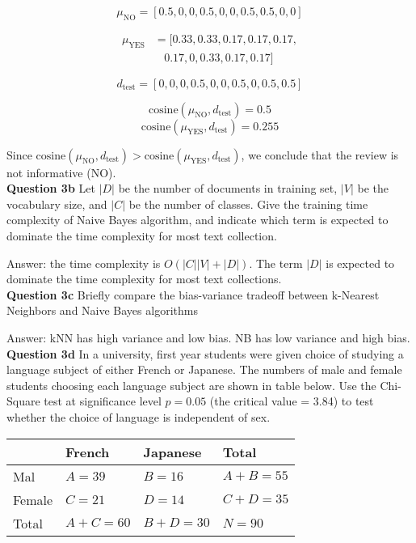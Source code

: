 \documentclass[11pt,a4paper]{report}
\begin{document}
\begin{multicols*}{2}
$$\mu_{\text{NO}} = [0.5, 0, 0, 0.5, 0, 0, 0.5, 0.5, 0, 0]$$

\begin{equation*}
\begin{split}
\mu_{\text{YES}} &= [0.33, 0.33, 0.17, 0.17, 0.17, \\
&\ \ \ \ 0.17, 0, 0.33, 0.17, 0.17]
\end{split}
\end{equation*}

$$d_{\text{test}} = [0,0,0,0.5,0,0,0.5,0,0.5,0.5]$$

$$\text{cosine}(\mu_{\text{NO}}, d_{\text{test}}) = 0.5$$
$$\text{cosine}(\mu_{\text{YES}}, d_{\text{test}}) = 0.255$$

\noindent Since $\text{cosine}(\mu_{\text{NO}}, d_{\text{test}}) > \text{cosine}(\mu_{\text{YES}}, d_{\text{test}})$, we conclude that the review is not informative (NO). \\

\noindent \textbf{Question 3b} Let $|D|$ be the number of documents in training set, $|V|$ be the vocabulary size, and $|C|$ be the number of classes. Give the training time complexity of Naive Bayes algorithm, and indicate which term is expected to dominate the time complexity for most text collection.

\noindent Answer: the time complexity is $O(|C||V|+|D|)$. The term $|D|$ is expected to dominate the time complexity for most text collections. \\

\noindent \textbf{Question 3c} Briefly compare the bias-variance tradeoff between k-Nearest Neighbors and Naive Bayes algorithms

\noindent Answer: kNN has high variance and low bias. NB has low variance and high bias.\\

\noindent \textbf{Question 3d} In a university, first year students were given choice of studying a language subject of either French or Japanese. The numbers of male and female students choosing each language subject are shown in table below. Use the Chi-Square test at significance level $p=0.05$ (the critical value = 3.84) to test whether the choice of language is independent of sex.

\scriptsize
\begin{center}
\begin{tabular}{ |l|l|l|l| } 
    \hline
            & French     & Japanese   & Total \\
    \hline 
    Mal     & $A = 39$   & $B = 16$   & $A+B=55$ \\
    Female  & $C = 21$   & $D = 14$   & $C+D=35$ \\
    Total   & $A+C = 60$ & $B+D = 30$ & $N=90$ \\
    \hline
\end{tabular}
\end{center}
\normalsize


\end{multicols*}
\end{document}
